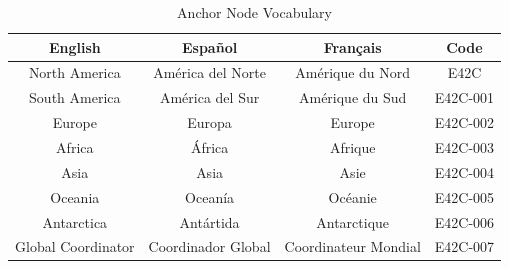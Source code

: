 \documentclass[12pt]{article}
\begin{document}
\begin{table}[h]
\centering
\begin{tabular}{|c|c|c|c|}
\hline
\textbf{English} & \textbf{Español} & \textbf{Français} & \textbf{Code} \\
\hline
North America & América del Norte & Amérique du Nord & E42C \\
\hline
South America & América del Sur & Amérique du Sud & E42C-001 \\
\hline
Europe & Europa & Europe & E42C-002 \\
\hline
Africa & África & Afrique & E42C-003 \\
\hline
Asia & Asia & Asie & E42C-004 \\
\hline
Oceania & Oceanía & Océanie & E42C-005 \\
\hline
Antarctica & Antártida & Antarctique & E42C-006 \\
\hline
Global Coordinator & Coordinador Global & Coordinateur Mondial & E42C-007 \\
\hline
\end{tabular}
\caption{Anchor Node Vocabulary}
\end{table}
\end{document}
